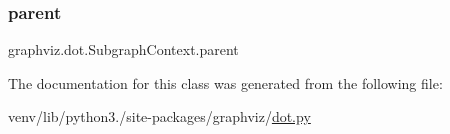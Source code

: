 \mbox{\label{classgraphviz_1_1dot_1_1SubgraphContext_aa3bf4e4942c5284cef208a9860a505bc}} 
\subsubsection{\texorpdfstring{parent}{parent}}
{\footnotesize\ttfamily graphviz.\+dot.\+Subgraph\+Context.\+parent}



The documentation for this class was generated from the following file\+:\begin{DoxyCompactItemize}
\item 
venv/lib/python3./site-\/packages/graphviz/\hyperlink{dot_8py}{dot.\+py}\end{DoxyCompactItemize}
